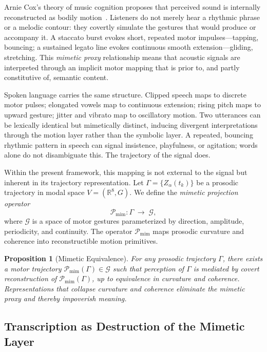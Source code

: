 \documentclass[12pt, a4paper]{article}
\newtheorem{proposition}{Proposition}
\begin{document}
Arnie Cox's theory of music cognition proposes that perceived sound is internally reconstructed as bodily motion~\cite{Cox2016}. Listeners do not merely hear a rhythmic phrase or a melodic contour: they covertly simulate the gestures that would produce or accompany it. A staccato burst evokes short, repeated motor impulses---tapping, bouncing; a sustained legato line evokes continuous smooth extension---gliding, stretching. This \emph{mimetic proxy} relationship means that acoustic signals are interpreted through an implicit motor mapping that is prior to, and partly constitutive of, semantic content.

Spoken language carries the same structure. Clipped speech maps to discrete motor pulses; elongated vowels map to continuous extension; rising pitch maps to upward gesture; jitter and vibrato map to oscillatory motion. Two utterances can be lexically identical but mimetically distinct, inducing divergent interpretations through the motion layer rather than the symbolic layer. A repeated, bouncing rhythmic pattern in speech can signal insistence, playfulness, or agitation; words alone do not disambiguate this. The trajectory of the signal does.

Within the present framework, this mapping is not external to the signal but inherent in its trajectory representation. Let $\Gamma = \{Z_\alpha(t_k)\}$ be a prosodic trajectory in modal space $V = (\mathbb{R}^8, G)$. We define the \emph{mimetic projection operator}
\begin{equation}
\mathcal{P}_{\mathrm{mim}} : \Gamma \;\longrightarrow\; \mathcal{G},
\label{eq:mimetic}
\end{equation}
where $\mathcal{G}$ is a space of motor gestures parameterized by direction, amplitude, periodicity, and continuity. The operator $\mathcal{P}_{\mathrm{mim}}$ maps prosodic curvature and coherence into reconstructible motion primitives.

\begin{proposition}[Mimetic Equivalence]
For any prosodic trajectory $\Gamma$, there exists a motor trajectory $\mathcal{P}_{\mathrm{mim}}(\Gamma) \in \mathcal{G}$ such that perception of $\Gamma$ is mediated by covert reconstruction of $\mathcal{P}_{\mathrm{mim}}(\Gamma)$, up to equivalence in curvature and coherence. Representations that collapse curvature and coherence eliminate the mimetic proxy and thereby impoverish meaning.
\end{proposition}

\subsection{Transcription as Destruction of the Mimetic Layer}
\end{document}
